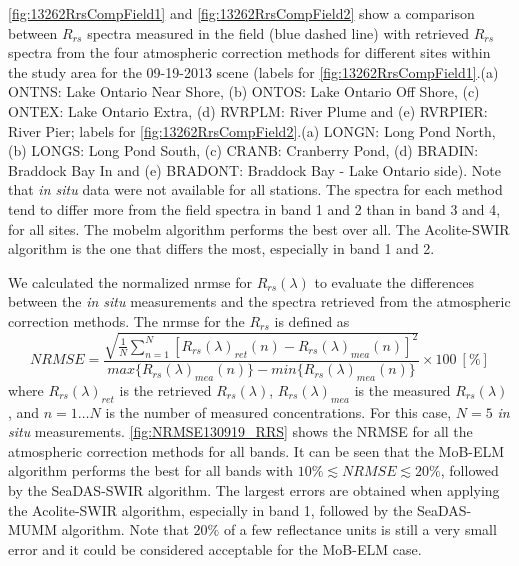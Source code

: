 \autoref{fig:13262RrsCompField1} and \autoref{fig:13262RrsCompField2} show a comparison between $R_{rs}$ spectra measured in the field (blue dashed line) with retrieved $R_{rs}$ spectra from the four atmospheric correction methods for different sites within the study area for the 09-19-2013 scene (labels for \autoref{fig:13262RrsCompField1}.(a) ONTNS: Lake Ontario Near Shore, (b) ONTOS: Lake Ontario Off Shore, (c) ONTEX: Lake Ontario Extra, (d) RVRPLM: River Plume and (e) RVRPIER: River Pier; labels for \autoref{fig:13262RrsCompField2}.(a) LONGN: Long Pond North, (b) LONGS: Long Pond South, (c) CRANB: Cranberry Pond, (d) BRADIN: Braddock Bay In and (e) BRADONT: Braddock Bay - Lake Ontario side). Note that {\it in situ} data were not available for all stations. The spectra for each method tend to differ more from the field spectra in band 1 and 2 than in band 3 and 4, for all sites. The \gls{mobelm} algorithm performs the best over all. The Acolite-SWIR algorithm is the one that differs the most, especially in band 1 and 2. 

We calculated the normalized \acrfull{nrmse} for $R_{rs}(\lambda)$ to evaluate the differences between the {\it in situ} measurements and the spectra retrieved from the atmospheric correction methods. The \gls{nrmse} for the $R_{rs}$ is defined as
\begin{equation}
\label{eq:NRMSE}
  NRMSE =\frac{\sqrt{\frac{1}{N}\sum_{n=1}^N{\left[R_{rs}(\lambda)_{ret}(n) - R_{rs}(\lambda)_{mea}(n)\right]^2}}}{max\{R_{rs}(\lambda)_{mea}(n)\} - min\{R_{rs}(\lambda)_{mea}(n)\}}\times100 ~[\%]
\end{equation}
\noindent where $R_{rs}(\lambda)_{ret}$ is the retrieved $R_{rs}(\lambda)$, $R_{rs}(\lambda)_{mea}$ is the measured $R_{rs}(\lambda)$, and $n=1\dots N$ is the number of measured concentrations. For this case, $N=5$ {\it in situ} measurements. \autoref{fig:NRMSE130919_RRS} shows the NRMSE for all the atmospheric correction methods for all bands. It can be seen that the MoB-ELM algorithm performs the best for all bands with  $10\%\lesssim NRMSE \lesssim 20\%$, followed by the SeaDAS-SWIR algorithm. The largest errors are obtained when applying the Acolite-SWIR algorithm, especially in band 1, followed by the SeaDAS-MUMM algorithm. Note that $20\%$ of a few reflectance units is still a very small error and it could be considered acceptable for the MoB-ELM case.




